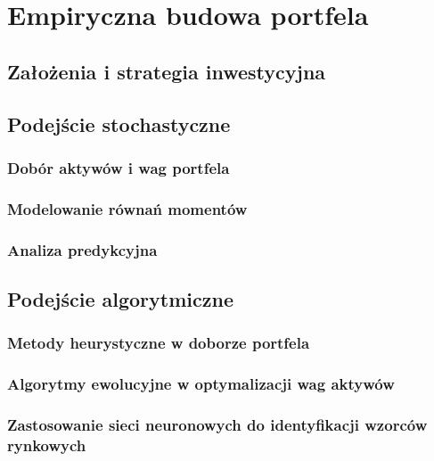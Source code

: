 \chapter{Empiryczna budowa portfela}
\label{chap:empiryczna-budowa-portfela}

\section{Założenia i strategia inwestycyjna}
\label{sec:zalozenia-i-strategia-inwestycyjna}

\section{Podejście stochastyczne}
\label{sec:podejscie-stochastyczne}

\subsection{Dobór aktywów i wag portfela}
\label{subsec:dobor-aktywow-i-wag}

\subsection{Modelowanie równań momentów}
\label{subsec:modelowanie-rownan-momentow}

\subsection{Analiza predykcyjna}
\label{subsec:analiza-predykcyjna}

\section{Podejście algorytmiczne}
\label{sec:podejscie-algorytmiczne}

\subsection{Metody heurystyczne w doborze portfela}
\label{subsec:metody-heurystyczne-w-doborze-portfela}

\subsection{Algorytmy ewolucyjne w optymalizacji wag aktywów}
\label{subsec:algorytmy-ewolucyjne-w-optymalizacji}

\subsection{Zastosowanie sieci neuronowych do identyfikacji wzorców rynkowych}
\label{subsec:zastosowanie-sieci-neuronowych}

